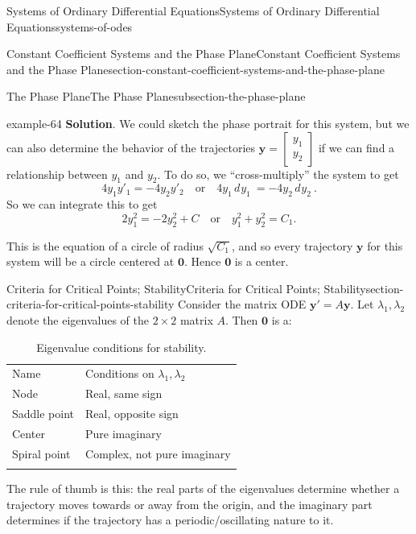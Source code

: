 \documentclass[oneside,10pt,]{book}
\numberwithin{equation}{section}
\newcommand{\hrulethick} {\noalign{\hrule height 0.11em}}
\renewcommand{\vec}[1]{\mathbf{#1}}
\newcommand{\dd}[2][]{\, d^{#1} #2\ }
\newcommand{\qq}[1]{\quad\text{#1}\quad}
\begin{document}
\begin{chapterptx}{Systems of Ordinary Differential Equations}{}{Systems of Ordinary Differential Equations}{}{}{systems-of-odes}
\begin{sectionptx}{Constant Coefficient Systems and the Phase Plane}{}{Constant Coefficient Systems and the Phase Plane}{}{}{section-constant-coefficient-systems-and-the-phase-plane}
\begin{subsectionptx}{The Phase Plane}{}{The Phase Plane}{}{}{subsection-the-phase-plane}
\begin{example}{}{example-64}
\noindent\textbf{Solution}.\hypertarget{solution-61}{}\quad%
\hypertarget{p-383}{}%
We could sketch the phase portrait for this system, but we can also determine the behavior of the trajectories \(\vec{y} = \begin{bmatrix} y_{1} \\ y_{2} \end{bmatrix} \) if we can find a relationship between \(y_{1}\) and \(y_{2}\). To do so, we ``cross-multiply'' the system to get%
\begin{equation*}
4y_{1}y'_{1} = -4y_{2}y'_{2} \quad\text{or}\quad 4y_{1}\dd{y_{1}} = -4y_{2}\dd{y_{2}}.
\end{equation*}
So we can integrate this to get%
\begin{equation*}
2y_{1}^{2} = -2y_{2}^{2}+C\qq{or}y_{1}^{2}+y_{2}^{2} = C_{1}.
\end{equation*}
%
\par
\hypertarget{p-384}{}%
This is the equation of a circle of radius \(\sqrt{C_{1}}\), and so every trajectory \(\vec{y}\) for this system will be a circle centered at \(\vec{0}\). Hence \(\vec{0}\) is a center.%
\end{example}
\end{subsectionptx}
\end{sectionptx}
%
%
\typeout{************************************************}
\typeout{************************************************}
%
\begin{sectionptx}{Criteria for Critical Points; Stability}{}{Criteria for Critical Points; Stability}{}{}{section-criteria-for-critical-points-stability}
\hypertarget{p-385}{}%
Consider the matrix ODE \(\vec{y}' = A\vec{y}\). Let \(\lambda_{1},\lambda_{2}\) denote the eigenvalues of the \(2\times 2\) matrix \(A\). Then \(\vec{0}\) is a:%
\begin{table}
\centering
\begin{tabular}{ll}\hrulethick
Name&Conditions on \(\lambda_{1},\lambda_{2}\)\tabularnewline\hrulethick
Node&Real, same sign\tabularnewline[0pt]
Saddle point&Real, opposite sign\tabularnewline[0pt]
Center&Pure imaginary\tabularnewline[0pt]
Spiral point&Complex, not pure imaginary\tabularnewline\hrulethick
\end{tabular}
\caption{Eigenvalue conditions for stability.\label{table-eigenvalue-conditions-stability}}
\end{table}
\hypertarget{p-386}{}%
The rule of thumb is this: the real parts of the eigenvalues determine whether a trajectory moves towards or away from the origin, and the imaginary part determines if the trajectory has a periodic\slash{}oscillating nature to it.%

\end{sectionptx}
\end{chapterptx}
\end{document}

